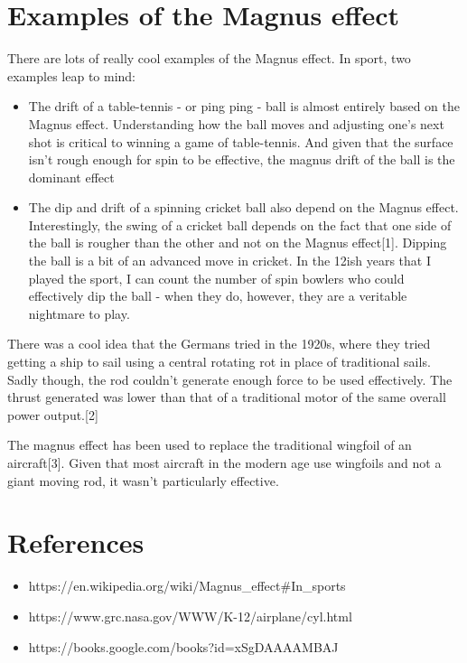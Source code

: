 \documentclass[english]{article}
\begin{document}
\section{Examples of the Magnus effect}
There are lots of really cool examples of the Magnus effect. 
In sport, two examples leap to mind: 
\begin{itemize}
	\item The drift of a table-tennis - or ping ping - ball is almost entirely 
		based on the Magnus effect. Understanding how the ball moves and adjusting
		one's next shot is critical to winning a game of table-tennis. And given
		that the surface isn't rough enough for spin to be effective, the magnus
		drift of the ball is the dominant effect
	\item The dip and drift of a spinning cricket ball also depend on the Magnus
		effect. Interestingly, the swing of a cricket ball depends on the fact
		that one side of the ball is rougher than the other and not on the Magnus
		effect[1]. Dipping the ball is a bit of an advanced move in 
		cricket. In the 12ish years that I played the sport, I can count the number
		of spin bowlers who could effectively dip the ball - when they do, however,
		they are a veritable nightmare to play.
\end{itemize}

There was a cool idea that the Germans tried in the 1920s, where they tried
getting a ship to sail using a central rotating rot in place of traditional
sails. 
Sadly though, the rod couldn't generate enough force to be used effectively.
The thrust generated was lower than that of a traditional motor of the same
overall power output.[2]

The magnus effect has been used to replace the traditional wingfoil of an 
aircraft[3]. Given that most aircraft in the modern
age use wingfoils and not a giant moving rod, it wasn't particularly
effective.

\section*{References}
\begin{itemize}
	\item https://en.wikipedia.org/wiki/Magnus\_effect\#In\_sports 
	\item https://www.grc.nasa.gov/WWW/K-12/airplane/cyl.html
	\item https://books.google.com/books?id=xSgDAAAAMBAJ
\end{itemize}
\end{document}
